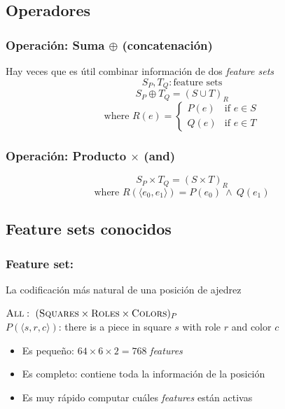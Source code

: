\subsection{Operadores}

\begin{frame}
\frametitle{Operación: Suma $\oplus$ (concatenación)}
Hay veces que es útil combinar información de dos \textit{feature sets} \\
\pause
\begin{equation*}
S_P, T_Q: \text{feature sets}
\end{equation*}
\begin{equation*}
S_P \oplus T_Q = {(S \cup T)}_R
\end{equation*}
\begin{equation*}
    \text{where } R(e) = \begin{cases}
        P(e) & \text{if } e \in S \\
        Q(e) & \text{if } e \in T
    \end{cases}
\end{equation*}
\end{frame}

\begin{frame}
\frametitle{Operación: Producto $\times$ (and)}
\begin{equation*}
S_P \times T_Q = {(S \times T)}_{R}
\end{equation*}
\begin{equation*}
\text{where } R(\langle e_0, e_1 \rangle) = P(e_0)\ \land\ Q(e_1)
\end{equation*}
\end{frame}

\subsection{Feature sets conocidos}

\begin{frame}
\frametitle{Feature set: }
La codificación más natural de una posición de ajedrez \\
\begin{center}
    $\textsc{All}:\ (\textsc{Squares} \times \textsc{Roles} \times \textsc{Colors})_{P}$ \\
    $P(\langle s, r, c \rangle)$: there is a piece in square $s$ with role $r$ and color $c$\\
\end{center}
\pause
\begin{itemize}
    \item<2-> Es pequeño: $64 \times 6 \times 2 = 768$ \textit{features}
    \item<3-> Es completo: contiene toda la información de la posición
    \item<4-> Es muy rápido computar cuáles \textit{features} están activas
\end{itemize}
\end{frame}


